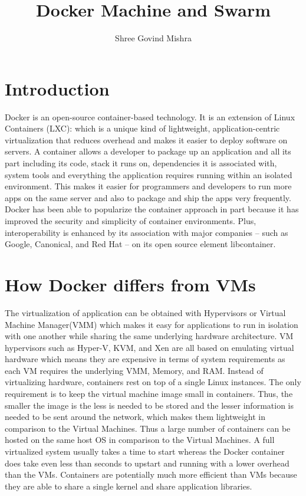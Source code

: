 \documentclass[9pt,twocolumn,twoside]{../../styles/osajnl}
\title{Docker Machine and Swarm}
\author[1]{Shree Govind Mishra}
\affil[1]{School of Informatics and Computing, Bloomington, IN 47408, U.S.A.}
\affil[*]{Corresponding authors:shremish@indiana.edu}
\begin{document}
\maketitle


\section{Introduction}
Docker is an open-source container-based technology. It is an
extension of Linux Containers (LXC): which is a unique kind of
lightweight, application-centric virtualization that reduces overhead
and makes it easier to deploy software on
servers\cite{www-docker-2}. A container allows a developer to package
up an application and all its part including its code, stack it runs
on, dependencies it is associated with, system tools and everything
the application requires running  within an isolated environment. This
makes it easier for programmers and developers to run more apps on the
same server and also to package and ship the apps very frequently.
Docker has been able to popularize the container approach in part
because it has improved the security and simplicity of container
environments. Plus, interoperability is enhanced by its association
with major companies – such as Google, Canonical, and Red Hat – on its
open source element libcontainer.

\section{How Docker differs from VMs}

The virtualization of application can be obtained with Hypervisors or
Virtual Machine Manager(VMM) which makes it easy for applications to
run in isolation with one another while sharing the same
underlying hardware architecture. VM hypervisors such as Hyper-V, KVM,
and Xen are all based on emulating virtual hardware which means they
are expensive in terms of system requirements as each VM requires the
underlying VMM, Memory, and RAM. Instead of virtualizing hardware,
containers rest on top of a single Linux instances. The only
requirement is to keep the virtual machine image small in containers.
Thus, the smaller the image is the less is needed to be stored and the
lesser information is needed to be sent around the network, which
makes them lightweight in comparison to the Virtual Machines. Thus a
large number of containers can be hosted on the same host OS in
comparison to the Virtual Machines. A full virtualized system usually
takes a time to start whereas the Docker container does take even less
than seconds to upstart and running with a lower overhead than the
VMs\cite{www-stackoverflow-docker}.  Containers are potentially much
more efficient than VMs because they are able to share a single kernel
and share application libraries.
\end{document}
